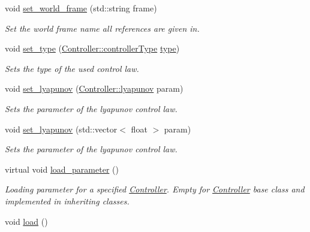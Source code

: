 \begin{DoxyCompactItemize}
\item 
void \hyperlink{classController_aeeb360dd2e4afb5c654f5bca4c0f00ca}{set\+\_\+world\+\_\+frame} (std\+::string frame)
\begin{DoxyCompactList}\small\item\em Set the world frame name all references are given in. \end{DoxyCompactList}\item 
void \hyperlink{classController_a7134d173f5f91755d8a3c7e07ca04da9}{set\+\_\+type} (\hyperlink{classController_a86221d052db839985bd6e4d73013cd06}{Controller\+::controller\+Type} \hyperlink{classController_af2488a28d3390288db92fa1d92aaed52}{type})
\begin{DoxyCompactList}\small\item\em Sets the type of the used control law. \end{DoxyCompactList}\item 
void \hyperlink{classController_a2ebb5b813be3525b44af61eb6f165964}{set\+\_\+lyapunov} (\hyperlink{structController_1_1lyapunov}{Controller\+::lyapunov} param)
\begin{DoxyCompactList}\small\item\em Sets the parameter of the lyapunov control law. \end{DoxyCompactList}\item 
void \hyperlink{classController_afb2d5fec93db7b68a16767823f4c1675}{set\+\_\+lyapunov} (std\+::vector$<$ float $>$ param)
\begin{DoxyCompactList}\small\item\em Sets the parameter of the lyapunov control law. \end{DoxyCompactList}\item 
virtual void \hyperlink{classController_a0758387181bc5902176813cc686cb088}{load\+\_\+parameter} ()\hypertarget{classController_a0758387181bc5902176813cc686cb088}{}\label{classController_a0758387181bc5902176813cc686cb088}

\begin{DoxyCompactList}\small\item\em Loading parameter for a specified \hyperlink{classController}{Controller}. Empty for \hyperlink{classController}{Controller} base class and implemented in inheriting classes. \end{DoxyCompactList}\item 
void \hyperlink{classController_a55c77d2e41634c9b21543647f74eec4c}{load} ()\hypertarget{classController_a55c77d2e41634c9b21543647f74eec4c}{}\label{classController_a55c77d2e41634c9b21543647f74eec4c}


\end{DoxyCompactItemize}
